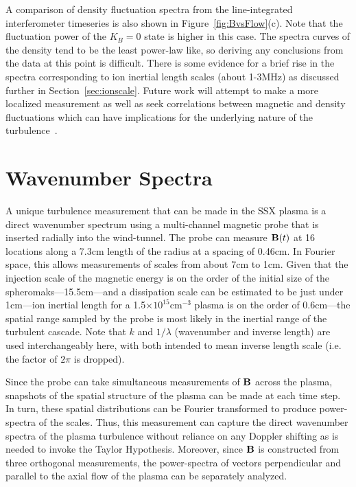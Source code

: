 \documentclass[preprint2]{aastex}
\begin{document}
A comparison of density fluctuation spectra from the line-integrated interferometer timeseries is also shown in Figure~\ref{fig:BvsFlow}(c). Note that the fluctuation power of the $K_{B}=0$ state is higher in this case. The spectra curves of the density tend to be the least power-law like, so deriving any conclusions from the data at this point is difficult. There is some evidence for a brief rise in the spectra corresponding to ion inertial length scales (about 1-3MHz) as discussed further in Section~\ref{sec:ionscale}. Future work will attempt to make a more localized measurement as well as seek correlations between magnetic and density fluctuations which can have implications for the underlying nature of the turbulence~\citep{kle12}.

\section{Wavenumber Spectra}\label{sec:wavenumber}

A unique turbulence measurement that can be made in the SSX plasma is a direct wavenumber spectrum using a multi-channel magnetic probe that is inserted radially into the wind-tunnel. The probe can measure ${\bf B}(t)$ at 16 locations along a 7.3cm length of the radius at a spacing of 0.46cm. In Fourier space, this allows measurements of scales from about 7cm to 1cm. Given that the injection scale of the magnetic energy is on the order of the initial size of the spheromaks---15.5cm---and a dissipation scale can be estimated to be just under 1cm---ion inertial length for a 1.5$\times 10^{15}$cm$^{-3}$ plasma is on the order of 0.6cm---the spatial range sampled by the probe is most likely in the inertial range of the turbulent cascade. Note that $k$ and $1/\lambda$ (wavenumber and inverse length) are used interchangeably here, with both intended to mean inverse length scale (i.e. the factor of $2\pi$ is dropped).

Since the probe can take simultaneous measurements of ${\bf B}$ across the plasma, snapshots of the spatial structure of the plasma can be made at each time step. In turn, these spatial distributions can be Fourier transformed to produce power-spectra of the scales. Thus, this measurement can capture the direct wavenumber spectra of the plasma turbulence without reliance on any Doppler shifting as is needed to invoke the Taylor Hypothesis. Moreover, since ${\bf B}$ is constructed from three orthogonal measurements, the power-spectra of vectors perpendicular and parallel to the axial flow of the plasma can be separately analyzed. 
\end{document}
